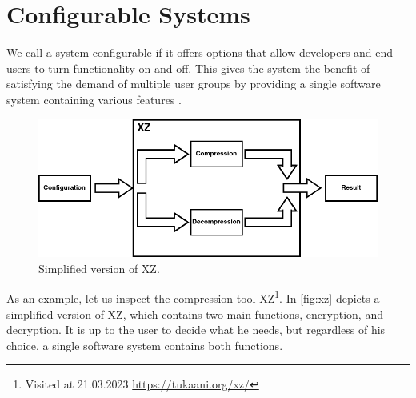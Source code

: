 \section{Configurable Systems}

We call a system configurable if it offers options that allow developers and end-users to turn functionality on and off.
This gives the system the benefit of satisfying the demand of multiple user groups by providing a single software system containing various features
\cite{TooManyKnobs}.


\begin{figure}[h]
    \centering
    \includegraphics[scale=0.55]{gfx/ConfigurableSystemXZ.png}
    \caption{Simplified version of XZ.}
    \label{fig:xz}
\end{figure}

As an example, let us inspect the compression tool \textsc{XZ}\footnote{Visited at 21.03.2023 \url{https://tukaani.org/xz/}}.
In \autoref{fig:xz} depicts a simplified version of \textsc{XZ}, which contains two main functions, encryption, and decryption. 
It is up to the user to decide what he needs, but regardless of his choice, a single software system contains both functions.